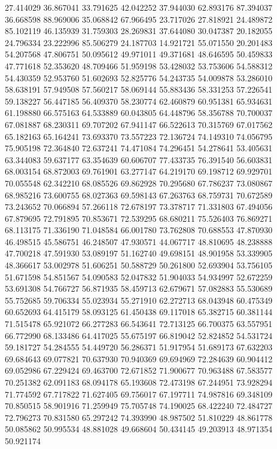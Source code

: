 27.414029
36.867041
33.791625
42.042252
37.944030
62.893176
87.394037
36.668598
88.969006
35.068842
67.966495
23.717026
27.818921
24.489872
85.102119
46.135939
31.759303
28.269831
37.644080
30.047387
20.182055
24.796334
23.222996
85.506279
24.187703
14.921721
55.071550
20.201483
54.207568
47.806751
50.095612
49.971011
49.371681
48.646595
50.459833
47.771618
52.353620
48.709466
51.959198
53.428032
53.753606
54.588312
54.430359
52.953760
51.602693
52.825776
54.243735
54.009878
53.286010
58.638191
57.949508
57.560217
58.069144
55.883436
58.331253
57.226541
59.138227
56.447185
56.409370
58.230774
62.460879
60.951381
65.934631
61.198880
66.575163
64.533889
60.043805
64.448796
58.356788
70.700037
67.081887
68.230311
69.707202
67.941147
66.522613
70.315769
67.017562
65.182163
65.164241
73.693370
73.557223
72.136724
74.149310
74.056795
75.905198
72.364840
72.637241
74.471084
74.296451
54.278641
53.405631
63.344083
59.637177
63.354639
60.606707
77.433735
76.391540
56.603831
68.003154
68.872003
69.761901
63.277147
64.219170
69.198712
69.929701
70.055548
62.342210
68.085526
69.862928
70.295680
67.786237
73.080867
68.985216
73.600755
68.027363
69.598143
67.263763
68.759731
70.672589
73.243652
70.066894
57.266118
72.678197
73.378717
71.331803
67.494056
67.879695
72.791895
70.853671
72.539295
68.680211
75.526403
76.869271
68.113175
71.336190
71.048584
66.001780
73.762808
70.688553
47.870930
46.498515
45.586751
46.248507
47.930571
44.067717
48.810695
48.238888
47.700218
47.591930
53.089197
51.162740
49.698151
48.901958
53.339905
48.366617
53.002978
51.606251
50.588729
50.261800
52.693904
53.756105
51.671598
54.851567
54.090583
52.047832
51.904033
54.934997
52.672259
53.691308
54.766727
56.871935
58.459713
62.679671
57.082883
55.530689
55.752685
59.706334
55.023934
55.271910
62.272713
68.043948
60.475349
60.652693
64.415179
58.093125
61.450438
69.117018
65.382715
60.381144
71.515478
65.921072
66.277283
66.543641
72.713125
66.700375
63.557951
66.772990
68.133486
64.417025
55.675197
66.819042
52.824852
54.531724
59.181727
54.284555
54.449720
56.286371
51.917954
51.689173
67.632203
69.684643
69.077821
70.637930
70.940369
69.694969
72.284639
60.904412
69.052986
67.229424
69.463700
72.671852
71.900677
70.963488
67.583577
70.251382
62.091183
68.094178
65.193608
72.473198
67.244951
73.928294
71.774592
67.717822
71.627405
69.756017
67.197711
74.987816
69.348109
70.850515
58.901916
71.259949
75.705748
74.190025
68.422240
72.484727
72.796273
70.831580
65.297242
74.393990
48.987502
51.810229
48.861778
50.085862
50.995534
48.881028
49.668604
50.434145
49.203913
48.971354
50.921174
